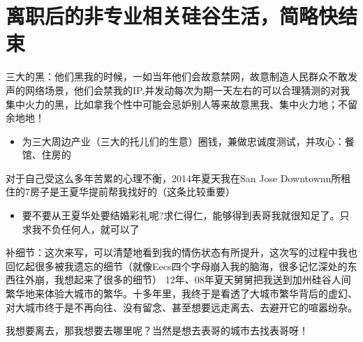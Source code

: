 \documentclass[9pt, b5paper]{article}
\begin{document}
\section{离职后的非专业相关硅谷生活，简略快结束}
\label{sec:orgd527523}
三大的黑：他们黑我的时候，一如当年他们会故意禁网，故意制造人民群众不敢发声的网络场景，他们会禁我的IP,并发动每次为期一天左右的可以合理猜测的对我集中火力的黑，比如拿我个性中可能会忌妒别人等来故意黑我、集中火力地；不留余地地！
\begin{itemize}
\item 为三大周边产业（三大的托儿们的生意）圈钱，兼做忠诚度测试，并攻心：餐馆、住房的
\end{itemize}
对于自己受这么多年苦累的心理不衡，2014年夏天我在San Jose Downtownn所租住的7房子是王夏华提前帮我找好的（这条比较重要）
\begin{itemize}
\item 要不要从王夏华处要结婚彩礼呢?求仁得仁，能够得到表哥我就很知足了。只求我不负任何人，就可以了
\end{itemize}
补细节：这次来写，可以清楚地看到我的情伤状态有所提升，这次写的过程中我也回忆起很多被我遗忘的细节（就像Eecs四个字母崩入我的脑海，很多记忆深处的东西往外崩，我想起来了很多的细节）
12年、08年夏天舅舅把我送到加州硅谷人间繁华地来体验大城市的繁华。十多年里，我终于是看透了大城市繁华背后的虚幻、对大城市终于是不再向往、没有留念、甚至想要远走离去、去避开它的喧嚣纷杂。

我想要离去，那我想要去哪里呢？当然是想去表哥的城市去找表哥呀！
\end{document}
